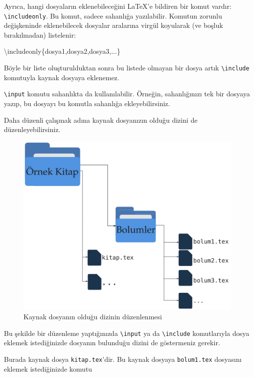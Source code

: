 \documentclass[
  10pt,
]{scrbook}
\newenvironment{Shaded}{\begin{snugshade}}{\end{snugshade}}
\newcommand{\NormalTok}[1]{#1}
\begin{document}
Ayrıca, hangi dosyaların eklenebileceğini LaTeX'e bildiren bir komut
vardır: \texttt{\textbackslash{}includeonly}. Bu komut, sadece sahanlığa yazılabilir. Komutun
zorunlu değişkeninde eklenebilecek dosyalar aralarına virgül koyularak
(ve boşluk bırakılmadan) listelenir:

\begin{Shaded}
\begin{Highlighting}[]
\NormalTok{\textbackslash{}includeonly\{dosya1,dosya2,dosya3,...\}}
\end{Highlighting}
\end{Shaded}

Böyle bir liste oluşturulduktan sonra bu listede olmayan bir dosya artık
\texttt{\textbackslash{}include} komutuyla kaynak dosyaya eklenemez.

\texttt{\textbackslash{}input} komutu sahanlıkta da kullanılabilir. Örneğin, sahanlığınızı tek
bir dosyaya yazıp, bu dosyayı bu komutla sahanlığa ekleyebilirsiniz.

Daha düzenli çalışmak adına kaynak dosyanızın olduğu dizini de
düzenleyebilirsiniz.

\begin{figure}
\centering
\includegraphics{images/dizin.png}
\caption{Kaynak dosyanın olduğu dizinin
düzenlenmesi}
\end{figure}

Bu şekilde bir düzenleme yaptığınızda \texttt{\textbackslash{}input} ya da \texttt{\textbackslash{}include}
komutlarıyla dosya eklemek istediğinizde dosyanın bulunduğu dizini de
göstermeniz gerekir.

Burada kaynak dosya \texttt{kitap.tex}'dir. Bu kaynak dosyaya \texttt{bolum1.tex}
dosyasını eklemek istediğinizde komutu
\end{document}

